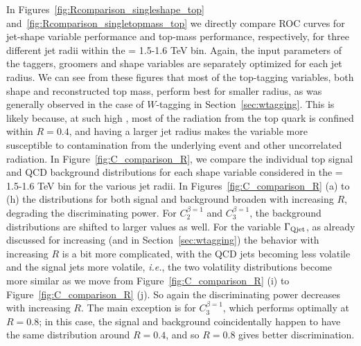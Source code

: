 In Figures~\ref{fig:Rcomparison_singleshape_top} and~\ref{fig:Rcomparison_singletopmass_top} we directly compare ROC curves for jet-shape variable performance and top-mass performance, respectively, for three different jet radii  within the \pt = 1.5-1.6 TeV bin. Again, the input parameters of the taggers, groomers and shape variables are separately optimized for each jet radius. We can see from these figures that most of the top-tagging variables, both shape and reconstructed top mass, perform best for smaller radius, as was generally observed in the case of $W$-tagging in Section~\ref{sec:wtagging}. This is likely because, at such high \pt, most of the radiation from the top quark is confined within $R=0.4$, and having a larger jet radius makes the variable more susceptible to contamination from the underlying event and other uncorrelated radiation. In Figure~\ref{fig:C_comparison_R}, we compare the individual top signal and QCD background distributions for each shape variable considered in the \pt = 1.5-1.6 TeV bin for the various jet radii. 
 In Figures~\ref{fig:C_comparison_R} (a) to (h) the distributions for both signal and background broaden with increasing $R$, degrading the discriminating power. 
For $C_2^{\beta=1}$ and $C_3^{\beta=1}$, the background distributions are shifted to larger values as well. 
For the variable $\Gamma_{\rm Qjet}$, as already discussed for increasing \pt (and in  Section~\ref{sec:wtagging}) the behavior with increasing $R$ is a bit
more complicated, with the QCD jets becoming less volatile and the signal jets more volatile, \textit{i.e.}, the two volatility distributions become more
similar as we move from Figure~\ref{fig:C_comparison_R} (i) to Figure~\ref{fig:C_comparison_R} (j).  So again 
the discriminating power decreases with increasing $R$. 
The main exception is   for $C_3^{\beta=1}$, which performs optimally at $R=0.8$; in this case, the signal and background coincidentally 
happen to have the same distribution around $R=0.4$, and so $R=0.8$ gives better discrimination.


